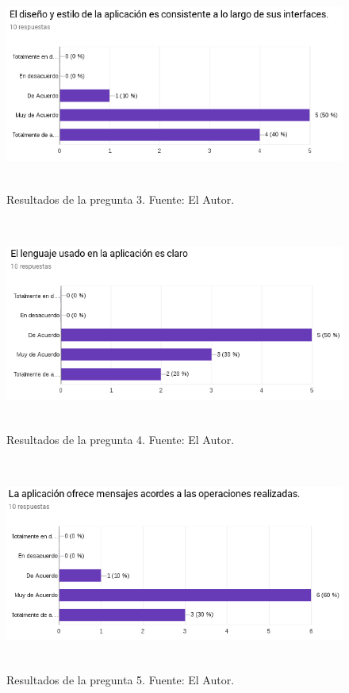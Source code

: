 \begin{figure}[H]
\begin{center}
	\includegraphics[width=\textwidth,height=7cm]{img/encuestas/diseno_consistente.png}
\end{center}
\caption{Resultados de la pregunta 3. Fuente: El Autor.}
\label{fig:respuesta_diseno_consistente}
\end{figure}

\begin{figure}[H]
\begin{center}
	\includegraphics[width=\textwidth,height=7cm]{img/encuestas/lenguaje_usado.png}
\end{center}
\caption{Resultados de la pregunta 4. Fuente: El Autor.}
\label{fig:respuesta_lenguaje_usado}
\end{figure}



\newpage
\begin{figure}[H]
\begin{center}
	\includegraphics[width=\textwidth,height=7cm]{img/encuestas/mensajes_acordes.png}
\end{center}
\caption{Resultados de la pregunta 5. Fuente: El Autor.}
\label{fig:respuesta_mensajes_acordes}
\end{figure}

